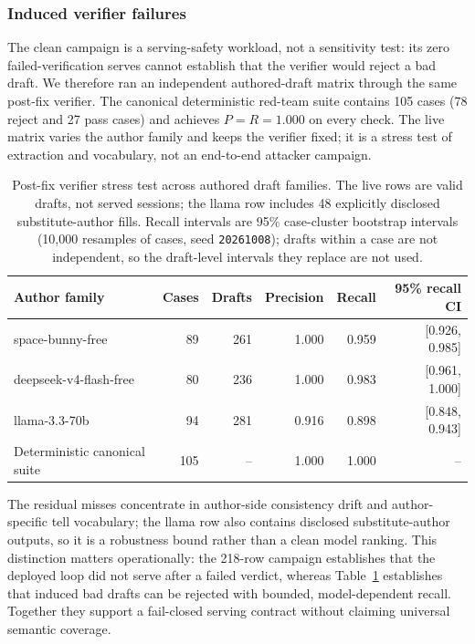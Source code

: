 \subsubsection{Induced verifier failures}
The clean campaign is a serving-safety workload, not a sensitivity test:
its zero failed-verification serves cannot establish that the verifier would
reject a bad draft. We therefore ran an independent authored-draft matrix
through the same post-fix verifier. The canonical deterministic red-team
suite contains 105 cases (78 reject and 27 pass cases) and achieves
$P=R=1.000$ on every check. The live matrix varies the author family and
keeps the verifier fixed; it is a stress test of extraction and vocabulary,
not an end-to-end attacker campaign.

\begin{table}[t]
\centering
\caption{Post-fix verifier stress test across authored draft families. The
live rows are valid drafts, not served sessions; the llama row includes 48
explicitly disclosed substitute-author fills. Recall intervals are 95\%
case-cluster bootstrap intervals (10{,}000 resamples of cases, seed
\texttt{20261008}); drafts within a case are not independent, so the
draft-level intervals they replace are not used.}
\label{tab:verifier-cross-family}
\scriptsize
\setlength{\tabcolsep}{3pt}
\begin{tabular}{lrrrrr}
\toprule
Author family & Cases & Drafts & Precision & Recall & 95\% recall CI \\
\midrule
space-bunny-free & 89 & 261 & 1.000 & 0.959 & [0.926, 0.985] \\
deepseek-v4-flash-free & 80 & 236 & 1.000 & 0.983 & [0.961, 1.000] \\
llama-3.3-70b & 94 & 281 & 0.916 & 0.898 & [0.848, 0.943] \\
\midrule
Deterministic canonical suite & 105 & -- & 1.000 & 1.000 & -- \\
\bottomrule
\end{tabular}
\end{table}

The residual misses concentrate in author-side consistency drift and
author-specific tell vocabulary; the llama row also contains disclosed
substitute-author outputs, so it is a robustness bound rather than a clean
model ranking. This distinction matters operationally: the 218-row campaign
establishes that the deployed loop did not serve after a failed verdict,
whereas Table~\ref{tab:verifier-cross-family} establishes that induced bad
drafts can be rejected with bounded, model-dependent recall. Together they
support a fail-closed serving contract without claiming universal semantic
coverage.

